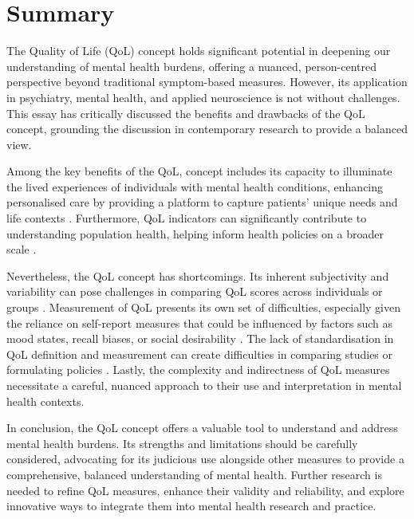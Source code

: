 \documentclass[10pt]{article}
\begin{document}
\begin{sloppypar}
  \section{Summary}
  \label{sec:summary}

  The Quality of Life (QoL) concept holds significant potential in deepening our understanding of mental health burdens, offering a nuanced, person-centred perspective beyond traditional symptom-based measures. However, its application in psychiatry, mental health, and applied neuroscience is not without challenges. This essay has critically discussed the benefits and drawbacks of the QoL concept, grounding the discussion in contemporary research to provide a balanced view.

  Among the key benefits of the QoL, concept includes its capacity to illuminate the lived experiences of individuals with mental health conditions, enhancing personalised care by providing a platform to capture patients' unique needs and life contexts
  \citep{dwamena_interventions_2012,endicott_quality_1993}. Furthermore, QoL indicators can significantly contribute to understanding population health, helping inform health policies on a broader scale
  \citep{gbd_2017_disease_and_injury_incidence_and_prevalence_collaborators_global_2018}.

  Nevertheless, the QoL concept has shortcomings. Its inherent subjectivity and variability can pose challenges in comparing QoL scores across individuals or groups \citep{skevington_expecting_2012}. Measurement of QoL presents its own set of difficulties, especially given the reliance on self-report measures that could be influenced by factors such as mood states, recall biases, or social desirability \citep{bowling_just_2005}. The lack of standardisation in QoL definition and measurement can create difficulties in comparing studies or formulating policies \citep{matarazzo_behavioral_1980}. Lastly, the complexity and indirectness of QoL measures necessitate a careful, nuanced approach to their use and interpretation in mental health contexts.

  In conclusion, the QoL concept offers a valuable tool to understand and address mental health burdens. Its strengths and limitations should be carefully considered, advocating for its judicious use alongside other measures to provide a comprehensive, balanced understanding of mental health. Further research is needed to refine QoL measures, enhance their validity and reliability, and explore innovative ways to integrate them into mental health research and practice.

  \pagebreak
  \singlespacing %
  
  

\end{sloppypar}
\end{document}

